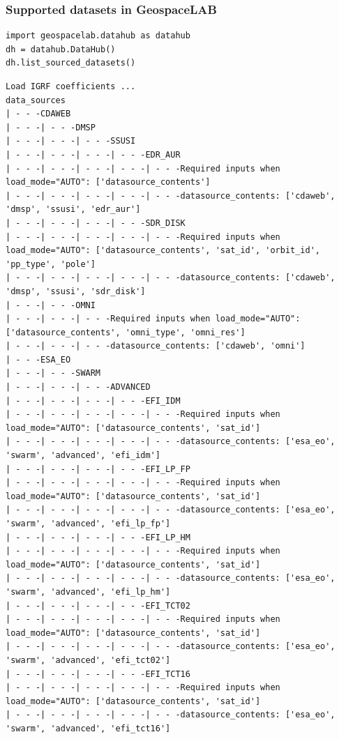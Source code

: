 \subsubsection{Supported datasets in GeospaceLAB}

\begin{verbatim}
import geospacelab.datahub as datahub
dh = datahub.DataHub()
dh.list_sourced_datasets()
\end{verbatim}

\begin{verbatim}
Load IGRF coefficients ...
data_sources
| - - -CDAWEB
| - - -| - - -DMSP
| - - -| - - -| - - -SSUSI
| - - -| - - -| - - -| - - -EDR_AUR
| - - -| - - -| - - -| - - -| - - -Required inputs when load_mode="AUTO": ['datasource_contents']
| - - -| - - -| - - -| - - -| - - -datasource_contents: ['cdaweb', 'dmsp', 'ssusi', 'edr_aur']
| - - -| - - -| - - -| - - -SDR_DISK
| - - -| - - -| - - -| - - -| - - -Required inputs when load_mode="AUTO": ['datasource_contents', 'sat_id', 'orbit_id', 'pp_type', 'pole']
| - - -| - - -| - - -| - - -| - - -datasource_contents: ['cdaweb', 'dmsp', 'ssusi', 'sdr_disk']
| - - -| - - -OMNI
| - - -| - - -| - - -Required inputs when load_mode="AUTO": ['datasource_contents', 'omni_type', 'omni_res']
| - - -| - - -| - - -datasource_contents: ['cdaweb', 'omni']
| - - -ESA_EO
| - - -| - - -SWARM
| - - -| - - -| - - -ADVANCED
| - - -| - - -| - - -| - - -EFI_IDM
| - - -| - - -| - - -| - - -| - - -Required inputs when load_mode="AUTO": ['datasource_contents', 'sat_id']
| - - -| - - -| - - -| - - -| - - -datasource_contents: ['esa_eo', 'swarm', 'advanced', 'efi_idm']
| - - -| - - -| - - -| - - -EFI_LP_FP
| - - -| - - -| - - -| - - -| - - -Required inputs when load_mode="AUTO": ['datasource_contents', 'sat_id']
| - - -| - - -| - - -| - - -| - - -datasource_contents: ['esa_eo', 'swarm', 'advanced', 'efi_lp_fp']
| - - -| - - -| - - -| - - -EFI_LP_HM
| - - -| - - -| - - -| - - -| - - -Required inputs when load_mode="AUTO": ['datasource_contents', 'sat_id']
| - - -| - - -| - - -| - - -| - - -datasource_contents: ['esa_eo', 'swarm', 'advanced', 'efi_lp_hm']
| - - -| - - -| - - -| - - -EFI_TCT02
| - - -| - - -| - - -| - - -| - - -Required inputs when load_mode="AUTO": ['datasource_contents', 'sat_id']
| - - -| - - -| - - -| - - -| - - -datasource_contents: ['esa_eo', 'swarm', 'advanced', 'efi_tct02']
| - - -| - - -| - - -| - - -EFI_TCT16
| - - -| - - -| - - -| - - -| - - -Required inputs when load_mode="AUTO": ['datasource_contents', 'sat_id']
| - - -| - - -| - - -| - - -| - - -datasource_contents: ['esa_eo', 'swarm', 'advanced', 'efi_tct16']

\end{verbatim}
